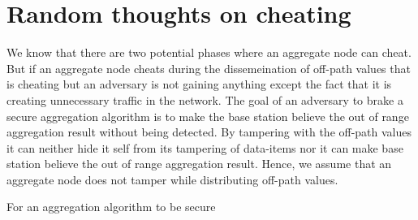 
\section{Random thoughts on cheating}
 We know that there are two potential phases where an aggregate node can cheat.
 But if an aggregate node cheats during the dissemeination of off-path values that is cheating but an adversary is not gaining anything except the fact that it is creating unnecessary traffic in the network.
 The goal of an adversary to brake a secure aggregation algorithm is to make the base station believe the out of range aggregation result without being detected.
 By tampering with the off-path values it can neither hide it self from its tampering of data-items nor it can make base station believe the out of range aggregation result. 
 Hence, we assume that an aggregate node does not tamper while distributing off-path values.
 
 For an aggregation algorithm to be secure